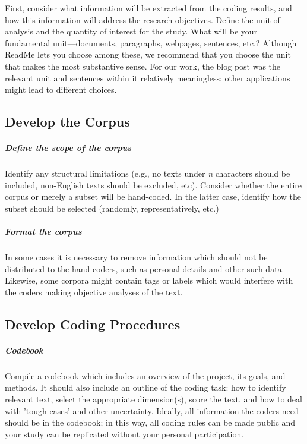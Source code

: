 \documentclass[oneside,letterpaper,titlepage]{article}
\begin{document}
First, consider what information will be extracted from the coding
results, and how this information will address the research
objectives. Define the unit of analysis and the quantity of interest
for the study.  What will be your fundamental unit---documents,
paragraphs, webpages, sentences, etc.?  Although ReadMe lets you
choose among these, we recommend that you choose the unit that makes
the most substantive sense.  For our work, the blog post was the
relevant unit and sentences within it relatively meaningless; other
applications might lead to different choices.

\subsection{Develop the Corpus}

\subparagraph{Define the scope of the corpus} Identify any structural
limitations (e.g., no texts under \emph{n} characters should be
included, non-English texts should be excluded, etc).  Consider
whether the entire corpus or merely a subset will be hand-coded. In
the latter case, identify how the subset should be selected (randomly,
representatively, etc.)

\subparagraph{Format the corpus} In some cases it is necessary to
remove information which should not be distributed to the hand-coders,
such as personal details and other such data. Likewise, some corpora
might contain tags or labels which would interfere with the coders
making objective analyses of the text.

\subsection{Develop Coding Procedures}

\subparagraph{Codebook} Compile a codebook which includes an overview
of the project, its goals, and methods. It should also include an
outline of the coding task: how to identify relevant text, select the
appropriate dimension(s), score the text, and how to deal with 'tough
cases' and other uncertainty.  Ideally, all information the coders
need should be in the codebook; in this way, all coding rules can be
made public and your study can be replicated without your personal
participation.
\end{document}
